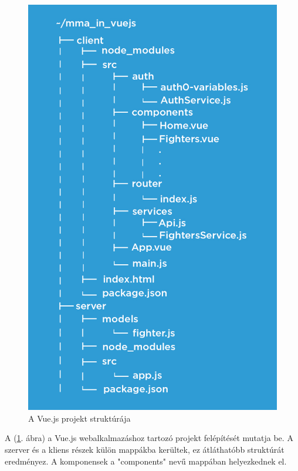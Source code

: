 \begin{figure}[htb]
\centering
\includegraphics[scale=0.8]{kepek/mma_in_vue.jpeg}
\caption{A Vue.js projekt struktúrája}
\label{fig:vue_structure}
\end{figure}

A (\ref{fig:vue_structure}. ábra) a Vue.js webalkalmazáshoz tartozó projekt felépítését mutatja be. A szerver és a kliens részek külön mappákba kerültek, ez átláthatóbb struktúrát eredményez. A komponensek a "components" nevű mappában helyezkednek el. \cite{Vue könyv} \cite{Vue oldal} 